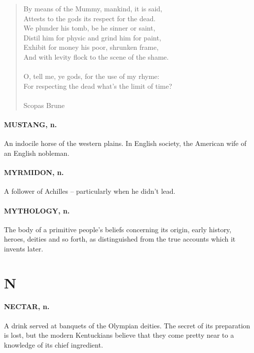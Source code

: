 \documentclass[11pt]{article}
\begin{document}
\begin{quote}   By means of the Mummy, mankind, it is said, \\
  Attests to the gods its respect for the dead. \\
  We plunder his tomb, be he sinner or saint, \\
  Distil him for physic and grind him for paint, \\
  Exhibit for money his poor, shrunken frame, \\
  And with levity flock to the scene of the shame. \\
  \\
  O, tell me, ye gods, for the use of my rhyme: \\
  For respecting the dead what's the limit of time? \\
 \\
Scopas Brune \end{quote}


\paragraph{MUSTANG, n.}  An indocile horse of the western plains.  In English
society, the American wife of an English nobleman.

\paragraph{MYRMIDON, n.}  A follower of Achilles -- particularly when he didn't
lead.

\paragraph{MYTHOLOGY, n.}  The body of a primitive people's beliefs concerning its
origin, early history, heroes, deities and so forth, as distinguished
from the true accounts which it invents later.



\section*{N}



\paragraph{NECTAR, n.}  A drink served at banquets of the Olympian deities.  The
secret of its preparation is lost, but the modern Kentuckians believe
that they come pretty near to a knowledge of its chief ingredient.
\end{document}
